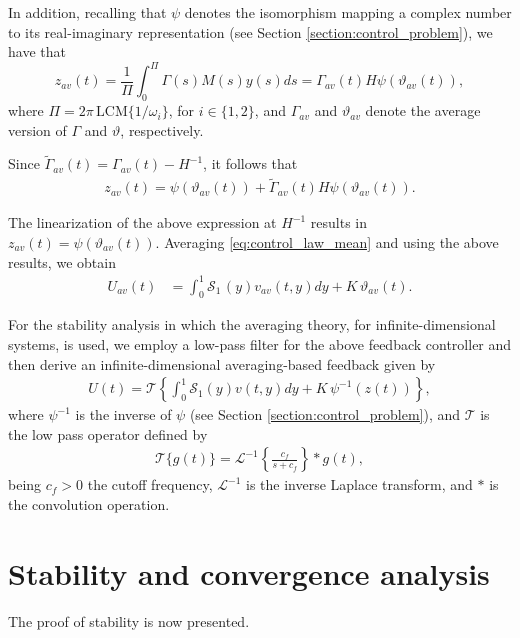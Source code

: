 \documentclass[letterpaper, 10 pt, conference]{ieeeconf}  %
\begin{document}
In addition, recalling that $\psi$ denotes the isomorphism mapping a complex number to its real-imaginary representation (see Section \ref{section:control_problem}), we have that  $$z_{av}(t) = \frac{1}{\Pi}\int_{0}^{\Pi}\Gamma(s) M(s)y(s)ds = \Gamma_{av}(t)H\psi(\vartheta_{av}(t)),$$ where $\Pi = 2\pi \, \mbox{LCM}\{1/\omega_{i}\}$, for $i\in \{1,2\}$, and $\Gamma_{av}$ and $\vartheta_{av}$ denote the average version of $\Gamma$ and $\vartheta$, respectively. 

Since $\tilde{\Gamma}_{av}(t)=\Gamma_{av}(t)-H^{-1}$, it follows that
\begin{align}
     z_{av}(t) = \psi(\vartheta_{av}(t)) +\tilde{\Gamma}_{av}(t)H\psi(\vartheta_{av}(t)).
\end{align}

The linearization of the above expression at $H^{-1}$ results in $z_{av}(t)=\psi(\vartheta_{av}(t))$. Averaging \eqref{eq:control_law_mean} and using the above results, we obtain
\begin{align}
    U_{av}(t) &= \int_{0}^{1}\mathcal{S}_{1\,}(y)v_{av}(t,y)dy+K\, \vartheta_{av}(t). \label{eq:control_law_av}
\end{align}

For the stability analysis in which the averaging theory, for infinite-dimensional systems, is used, we employ a low-pass filter for the above feedback controller and then derive an infinite-dimensional averaging-based feedback given by 
\begin{align}
    U(t) = \mathcal{T}\left\{\int_{0}^{1}\mathcal{S}_{1}(y)v(t,y)dy+K\, \psi^{-1}(z(t)) \right\},\label{eq:filtered_controller}
\end{align}
\noindent where $\psi^{-1}$ is the inverse of $\psi$ (see Section \ref{section:control_problem}), and $\mathcal{T}$ is the low pass operator defined by
\begin{align*}
    \mathcal{T}\{g (t)\} = \mathcal{L}^{-1}\left\{ \frac{c_f}{s+c_f}\right\}*g (t),
\end{align*}
\noindent being $c_f>0$ the cutoff frequency, $\mathcal{L}^{-1}$ is the inverse Laplace transform, and $*$ is the convolution operation.

\section{Stability and convergence analysis}\label{section:stability}

The proof of stability is now presented. 
\end{document}
